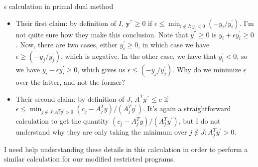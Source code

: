 \documentclass[11pt]{article}
\renewcommand{\'}{^{'}}
\begin{document}
\begin{section}{$\epsilon$ calculation in primal dual method}
	\begin{itemize}
		\item Their first claim: by definition of $I$, $\mathbf{y}^{''} \geq 0$ if $\epsilon 
			\leq 
			\min_{i\notin I: y_i^{'} < 0} (-y_i/y_i^{'})$. I'm not quite sure how they 
			make this conclusion. Note that $y^{''}\geq 0$ is 
			$y_i + \epsilon y_i^{'} \geq 0$. Now, there are two cases, either $y_i^{'} 
			\geq 0$, in which case we have $\epsilon \geq (-y_j / y_j^{'})$, which is 
			negative. In the other case, we have that $y_i^{'} < 0$, so we have 
			$y_i - \epsilon y_i^{'} \geq 0$, which gives us $\epsilon \leq (-y_j/y_j^{'})$.
			Why do we minimize $\epsilon$ over the latter, and not the former?
		\item Their second claim: by definition of $J$, $A^{T}y^{''} \leq c$ if 
			$\epsilon \leq \min_{j\notin J: A^{T}_jy^{'} > 0} (c_j - A^{T}_j y)/
			(A^{T}_jy^{'})$. It's again a straightforward calculation to get the quantity
			$(c_j - A^{T}_j y)/(A^{T}_jy^{'})$, but I do not understand why they are 
			only taking the minimum over $j\notin J: A^{T}_jy^{'} > 0$.
	\end{itemize}
	I need help understanding these details in this calculation in order to perform a similar 
	calculation for our modified restricted programs.
\end{section}
\end{document}
